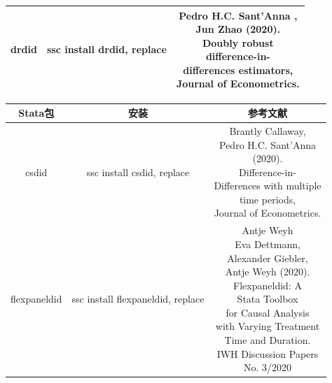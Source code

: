 \documentclass[cn,12pt,math=newtx,citestyle=gb7714-2015,bibstyle=gb7714-2015]{elegantbook}
\makeatletter
\newcommand{\tabincell}[2]{\begin{tabular}{@{}#1@{}}#2\end{tabular}}  %
\makeatother
\begin{document}
\begin{table}[htbp]
\begin{longtable}{|c|c|c|}
			drdid &	ssc install drdid, replace& \tabincell{c}{ Pedro H.C. Sant'Anna ,\\ Jun Zhao (2020).\\ Doubly robust\\ difference-in-\\differences estimators, \\Journal of Econometrics.}\\
			\hline
			
			
		\end{longtable}
	\end{table}
	
	
	\begin{table}[htbp]
		\centering
		\caption{交叠DID的Stata包及对应文献(续表)}
		\begin{longtable}{|c|c|c|}
			\hline
			Stata包&安装  & 参考文献 \\
			\hline
			
			csdid &	ssc install csdid, replace& \tabincell{c}{Brantly Callaway, \\Pedro H.C. Sant'Anna  \\(2020).\\ Difference-in-\\Differences with multiple \\time periods, \\Journal of Econometrics.}\\
			\hline
			flexpaneldid &	ssc install flexpaneldid, replace&\tabincell{c}{Antje Weyh\\	Eva Dettmann, \\Alexander Giebler,\\ Antje Weyh (2020).\\ Flexpaneldid: A \\Stata Toolbox \\for Causal Analysis \\with Varying Treatment \\Time and Duration. \\IWH Discussion Papers \\No. 3/2020} \\
			\hline
			

\end{longtable}
\end{table}
\end{document}
